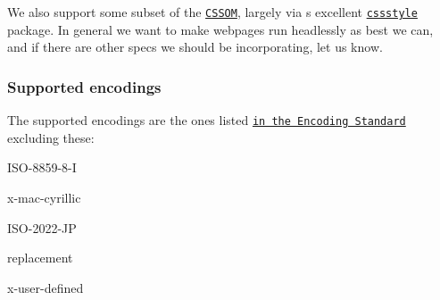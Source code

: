 We also support some subset of the \href{http://dev.w3.org/csswg/cssom/}{\tt C\+S\+S\+OM}, largely via \href{https://github.com/chad3814}{\tt }\textquotesingle{}s excellent \href{https://www.npmjs.org/package/cssstyle}{\tt cssstyle} package. In general we want to make webpages run headlessly as best we can, and if there are other specs we should be incorporating, let us know.

\subsubsection*{Supported encodings}

The supported encodings are the ones listed \href{https://encoding.spec.whatwg.org/#names-and-labels}{\tt in the Encoding Standard} excluding these\+:


\begin{DoxyItemize}
\item I\+S\+O-\/8859-\/8-\/I
\item x-\/mac-\/cyrillic
\item I\+S\+O-\/2022-\/\+JP
\item replacement
\item x-\/user-\/defined 
\end{DoxyItemize}
